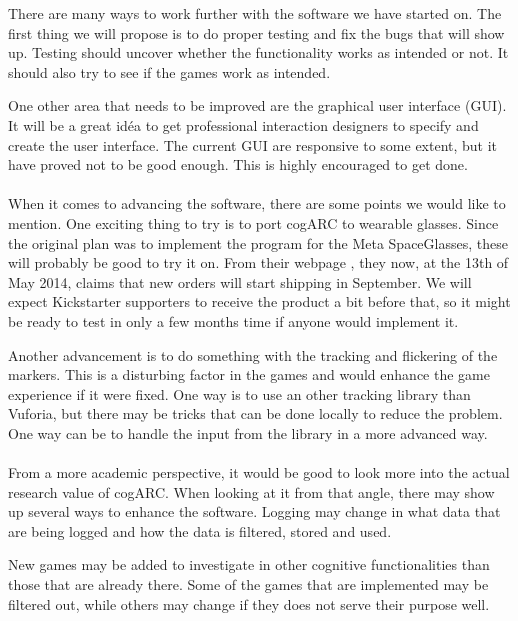 There are many ways to work further with the software we have started on.
The first thing we will propose is to do proper testing and fix the bugs that
will show up. Testing should uncover whether the functionality works as 
intended or not. It should also try to see if the games work as intended.

One other area that needs to be improved are the graphical user interface (GUI).
It will be a great id\'ea to get professional interaction designers to specify
and create the user interface. The current GUI are responsive to some extent, 
but it have proved not to be good enough. This is highly encouraged to get 
done.

\paragraph{}

When it comes to advancing the software, there are some points we would like 
to mention. One exciting thing to try is to port cogARC to wearable glasses.
Since the original plan was to implement the program for the \gls{Meta 
SpaceGlasses}, these will probably be good to try it on. From their webpage
\cite{MetaSpaceGlasses}, they now, at the 13th of May 2014, claims that new 
orders will start shipping in September. We will expect Kickstarter supporters 
to receive the product a bit before that, so it might be ready to test in only
a few months time if anyone would implement it.

Another advancement is to do something with the tracking and flickering of the 
markers. This is a disturbing factor in the games and would enhance the game
experience if it were fixed. One way is to use an other tracking library than
Vuforia, but there may be tricks that can be done locally to reduce the 
problem. One way can be to handle the input from the library in a more advanced
way.

\paragraph{}

From a more academic perspective, it would be good to look more into the actual
research value of cogARC. When looking at it from that angle, there may show up
several ways to enhance the software. Logging may change in what data that are
being logged and how the data is filtered, stored and used.

New games may be added to investigate in other cognitive functionalities than 
those that are already there. Some of the games that are implemented may be
filtered out, while others may change if they does not serve their purpose well.
